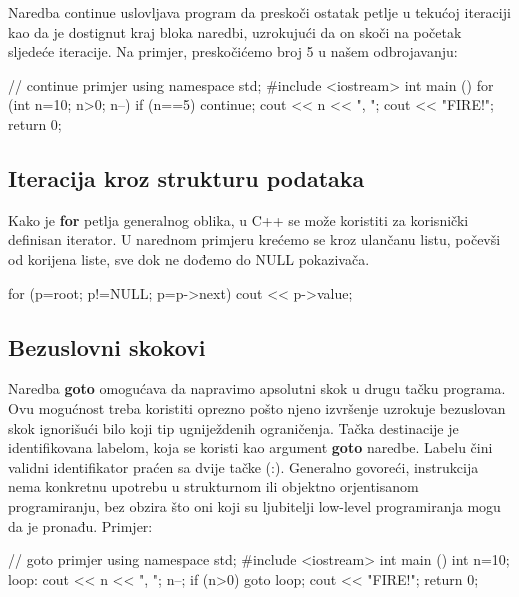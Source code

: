 \documentclass[11pt]{book}
\begin{document}
Naredba continue uslovljava program da preskoči ostatak petlje u tekućoj iteraciji kao da je dostignut kraj bloka naredbi, uzrokujući da on skoči na početak sljedeće iteracije. Na primjer, preskočićemo broj 5 u našem odbrojavanju:

\begin{shortlisting}
  // continue primjer
  using namespace std;
  #include <iostream>
  int main () {
      for (int n=10; n>0; n--) {
          if (n==5) continue;
          cout << n << ", ";
        }
      cout << "FIRE!\n";
      return 0;
    }
\end{shortlisting}


\subsection{Iteracija kroz strukturu podataka}

Kako je \textbf{for} petlja generalnog oblika, u C++ se može koristiti za korisnički definisan iterator. U narednom primjeru krećemo se kroz ulančanu listu, počevši od korijena liste, sve dok ne dođemo do NULL pokazivača.

\begin{shortlisting}
  for (p=root; p!=NULL; p=p->next)
    {
      cout << p->value;
    }
\end{shortlisting}


\subsection{Bezuslovni skokovi}

Naredba \textbf{goto} omogućava da napravimo apsolutni skok u drugu tačku programa. Ovu mogućnost treba koristiti oprezno pošto njeno izvršenje uzrokuje bezuslovan skok ignorišući bilo koji tip ugniježdenih ograničenja. Tačka destinacije je identifikovana labelom, koja se koristi kao argument \textbf{goto} naredbe. Labelu čini validni identifikator praćen sa dvije tačke (:). Generalno govoreći, instrukcija nema konkretnu upotrebu u strukturnom ili objektno orjentisanom programiranju, bez obzira što oni koji su ljubitelji low-level programiranja mogu da je pronađu. Primjer:

\begin{shortlisting}
  // goto primjer
  using namespace std;
  #include <iostream>
  int main () {
      int n=10;
      loop: cout << n << ", ";
      n--;
      if (n>0) goto loop;
      cout << "FIRE!\n";
      return 0;
    }
\end{shortlisting}
\end{document}
